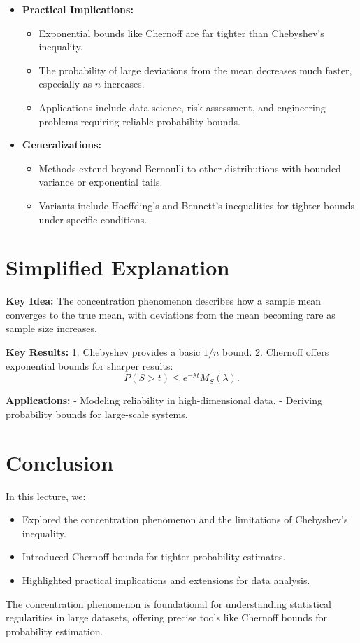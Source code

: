 \documentclass{article}
\begin{document}
\begin{itemize}
  \item \textbf{Practical Implications:}
    \begin{itemize}
      \item Exponential bounds like Chernoff are far tighter than Chebyshev's inequality.
      \item The probability of large deviations from the mean decreases much faster, especially as $n$ increases.
      \item Applications include data science, risk assessment, and engineering problems requiring reliable probability bounds.
    \end{itemize}

  \item \textbf{Generalizations:}
    \begin{itemize}
      \item Methods extend beyond Bernoulli to other distributions with bounded variance or exponential tails.
      \item Variants include Hoeffding's and Bennett's inequalities for tighter bounds under specific conditions.
    \end{itemize}
\end{itemize}

\section*{Simplified Explanation}

\textbf{Key Idea:}
The concentration phenomenon describes how a sample mean converges to the true mean, with deviations from the mean becoming rare as sample size increases.

\textbf{Key Results:}
1. Chebyshev provides a basic $1/n$ bound.
2. Chernoff offers exponential bounds for sharper results:
\[
  P(S > t) \leq e^{-\lambda t} M_S(\lambda).
\]

\textbf{Applications:}
- Modeling reliability in high-dimensional data.
- Deriving probability bounds for large-scale systems.

\section*{Conclusion}

In this lecture, we:
\begin{itemize}
  \item Explored the concentration phenomenon and the limitations of Chebyshev's inequality.
  \item Introduced Chernoff bounds for tighter probability estimates.
  \item Highlighted practical implications and extensions for data analysis.
\end{itemize}

The concentration phenomenon is foundational for understanding statistical regularities in large datasets, offering precise tools like Chernoff bounds for probability estimation.
\end{document}
